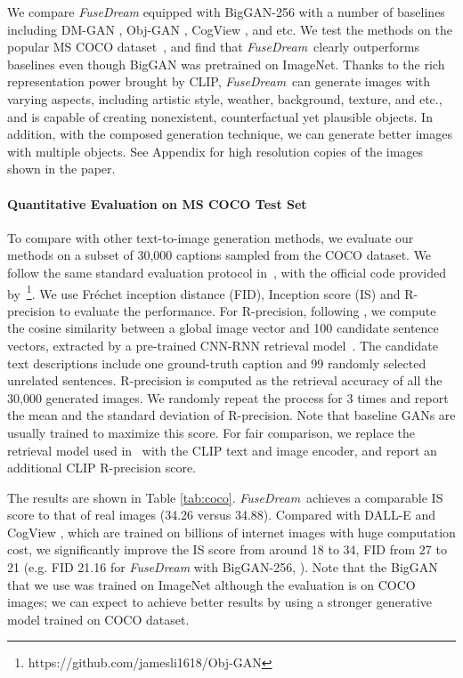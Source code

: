 \documentclass[10pt,twocolumn,letterpaper]{article}
\newcommand{\our}{\emph{FuseDream}}
\begin{document}
We  compare {\our} equipped with BigGAN-256 with a number of baselines including DM-GAN \cite{zhu2019dm}, Obj-GAN \cite{li2019object}, CogView \cite{ding2021cogview}, and etc. 
We test the methods 
on the popular MS COCO dataset~\cite{lin2014microsoft}, and find that \our~clearly outperforms baselines even though BigGAN was pretrained on ImageNet. Thanks to the rich representation power brought by CLIP,  
\our~can generate images 
with varying aspects,   including artistic style, weather, background, texture, and etc., and is  capable of creating nonexistent,  counterfactual yet plausible objects.   
In addition, with the composed generation technique, we can 
generate better images with multiple objects. 
See Appendix for high resolution copies of the images shown in the paper.


\paragraph{Quantitative Evaluation on MS COCO Test Set}
To compare with other text-to-image generation methods, we evaluate our methods on a subset of 30,000 captions sampled from the COCO dataset. We follow the same standard evaluation protocol in~\cite{xu2018attngan, li2019object, tao2020df, zhu2019dm}, with the official code provided by~\cite{li2019object}\footnote{https://github.com/jamesli1618/Obj-GAN}.
We use Fréchet inception distance (FID),  Inception score (IS)
and R-precision to evaluate the performance.
For R-precision, 
following \cite{xu2018attngan, li2019object,zhu2019dm, tao2020df}, we compute the cosine similarity between a global image vector and 100 candidate sentence vectors, extracted by a pre-trained CNN-RNN retrieval model~\cite{xu2018attngan}. The candidate text descriptions include one ground-truth caption and 99 randomly selected unrelated sentences. R-precision is computed as the retrieval accuracy of all the 30,000 generated images.
We randomly repeat the process for 3 times and report the mean and the standard deviation of R-precision.
Note that baseline GANs are usually trained to maximize this score. For fair comparison, 
we replace the retrieval model used in~
\cite{xu2018attngan} with the CLIP text and image encoder, and report an additional CLIP R-precision score.


The results are shown in Table \ref{tab:coco}.
\our~achieves a comparable IS score to that of real images (34.26 versus 34.88).
Compared with DALL-E \cite{ramesh2021zero} and CogView \cite{ding2021cogview}, which are trained on billions of internet images with huge computation cost, 
we significantly improve the IS score from around 18 to 34, FID from 27 to 21 (e.g. FID 21.16 for {\our} with BigGAN-256, ).
Note that the BigGAN that we use was 
trained on ImageNet although the evaluation is on COCO images; we can expect to achieve better results by using a stronger generative model trained on COCO dataset.
\end{document}
